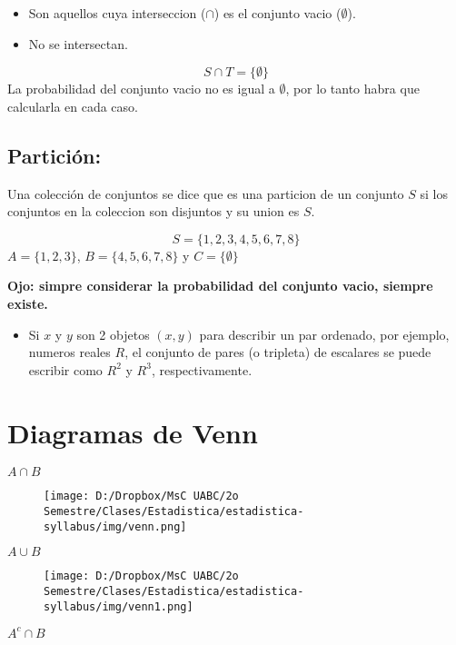 \documentclass[]{book}
\providecommand{\tightlist}{%
  \setlength{\itemsep}{0pt}\setlength{\parskip}{0pt}}
\begin{document}
\begin{itemize}
\tightlist
\item
  Son aquellos cuya interseccion (\(\cap\)) es el conjunto vacio
  (\(\emptyset\)).
\item
  No se intersectan.
\end{itemize}

\[S \cap T = \{ \emptyset\}\] La probabilidad del conjunto vacio no es
igual a \(\emptyset\), por lo tanto habra que calcularla en cada caso.

\subsection{Partición:}\label{particion-1}

Una colección de conjuntos se dice que es una particion de un conjunto
\(S\) si los conjuntos en la coleccion son disjuntos y su union es
\(S\).

\[S = \{1,2,3,4,5,6,7,8\}\] \(A = \{1,2,3\}\), \(B = \{4,5,6,7,8\}\) y
\(C = \{\emptyset\}\)

 \textbf{Ojo: simpre considerar la probabilidad del conjunto vacio,
siempre existe.}

\begin{itemize}
\tightlist
\item
  Si \(x\) y \(y\) son 2 objetos \((x,y)\) para describir un par
  ordenado, por ejemplo, numeros reales \(R\), el conjunto de pares (o
  tripleta) de escalares se puede escribir como \(R^2\) y \(R^3\),
  respectivamente.
\end{itemize}

\section{Diagramas de Venn}\label{diagramas-de-venn-1}

 \(A \cap B\)

\begin{figure}[htbp]
\centering
\texttt{[image: D:/Dropbox/MsC UABC/2o Semestre/Clases/Estadistica/estadistica-syllabus/img/venn.png]}
\caption{}
\end{figure}

\(A\cup B\)

\begin{figure}[htbp]
\centering
\texttt{[image: D:/Dropbox/MsC UABC/2o Semestre/Clases/Estadistica/estadistica-syllabus/img/venn1.png]}
\caption{}
\end{figure}

\(A^c \cap B\)
\end{document}
